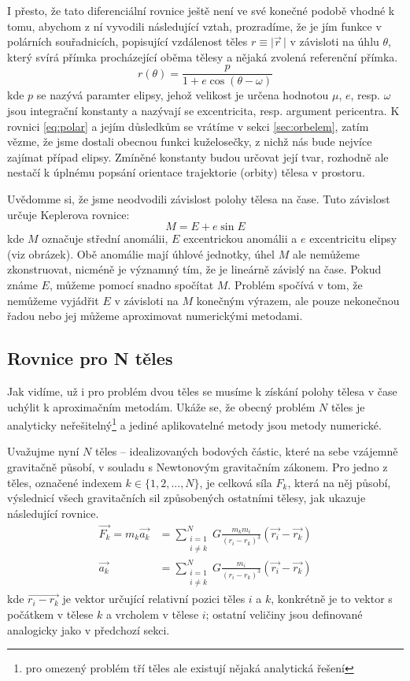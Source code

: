 \documentclass[A4paper, 12pt, oneside]{book}
\newcommand{\abs}[1]{\lvert #1 \,\rvert}
\begin{document}
I přesto, že tato diferenciální rovnice ještě není ve své konečné podobě vhodné k tomu, abychom z ní vyvodili následující vztah, prozradíme, že je jím funkce v polárních souřadnicích, popisující vzdálenost těles $r\equiv\abs{\vec{r}}$ v závisloti na úhlu $\theta$, který svírá přímka procházející oběma tělesy a nějaká zvolená referenční přímka. 
\begin{equation} \label{eq:polar}
	r(\theta)=\frac{p}{1+e\cos{(\theta-\omega)}}
\end{equation}
kde $p$ se nazývá paramter elipsy, jehož velikost je určena hodnotou $\mu$, $e$, resp. $\omega$ jsou integrační konstanty a nazývají se excentricita, resp. argument pericentra. K rovnici \eqref{eq:polar} a jejím důsledkům se vrátíme v sekci \ref{sec:orbelem}, zatím vězme, že jsme dostali obecnou funkci kuželosečky, z nichž nás bude nejvíce zajímat případ elipsy. Zmíněné konstanty budou určovat její tvar, rozhodně ale nestačí k úplnému popsání orientace trajektorie (orbity) tělesa v prostoru. 

Uvědomme si, že jsme neodvodili závislost polohy tělesa na čase. Tuto závislost určuje Keplerova rovnice:
\begin{equation} \label{eq:kepler}
M = E + e\sin E
\end{equation}
kde $M$ označuje střední anomálii, $E$ excentrickou anomálii a $e$ excentricitu elipsy (viz obrázek). Obě anomálie mají úhlové jednotky, úhel $M$ ale nemůžeme zkonstruovat, nicméně je významný tím, že je lineárně závislý na čase. Pokud známe $E$, můžeme pomocí snadno spočítat $M$.  Problém spočívá v tom, že nemůžeme vyjádřit $E$ v závisloti na $M$ konečným výrazem, ale pouze nekonečnou řadou nebo jej můžeme aproximovat numerickými metodami.

\subsection{Rovnice pro N těles}
Jak vidíme, už i pro problém dvou těles se musíme k získání polohy tělesa v čase uchýlit k aproximačním metodám. Ukáže se, že obecný problém $N$ těles je analyticky neřešitelný\footnote{pro omezený problém tří těles ale existují nějaká analytická řešení} a jediné aplikovatelné metody jsou metody numerické.

Uvažujme nyní $N$ těles -- idealizovaných bodových částic, které na sebe vzájemně gravitačně působí, v souladu s Newtonovým gravitačním zákonem. Pro jedno z těles, označené indexem $k\in\{1,2,...,N\}$, je celková síla $F_k$, která na něj působí, výslednicí všech gravitačních sil způsobených ostatními tělesy, jak ukazuje následující rovnice.
\begin{align} \label{eq:nbody}
		\vec{F_k} = m_k\vec{a_k} &= \sum_{\substack{i=1 \\ i\neq k}}^N G\frac{m_km_i}{(r_i-r_k)^3}(\vec{r_i}-\vec{r_k}) \nonumber \\
		\vec{a_k} &= \sum_{\substack{i=1 \\ i\neq k}}^N G\frac{m_i}{(r_i-r_k)^3}(\vec{r_i}-\vec{r_k}) 
\end{align}
kde $\vec{r_i-r_k}$ je vektor určující relativní pozici těles $i$ a $k$, konkrétně je to vektor s počátkem v tělese $k$ a vrcholem v tělese $i$; ostatní veličiny jsou definované analogicky jako v předchozí sekci.
\end{document}
